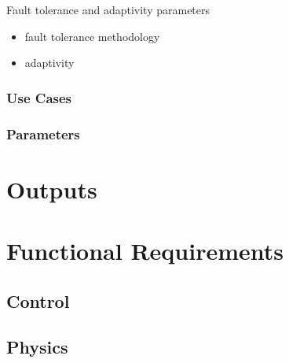 \documentclass{book}
\begin{document}
Fault tolerance and adaptivity parameters

\begin{itemize}
\item fault tolerance methodology
\item adaptivity
\end{itemize}

\subsection{Use Cases}
\subsection{Parameters}

\chapter{Outputs} \label{c:outputs}

\chapter{Functional Requirements}

\section{Control}

\section{Physics}

\end{document}
